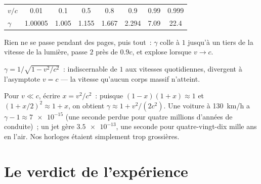 \begin{example}\label{ex:g12:special-relativity:gammatable}
\begin{center}\small
\begin{tabular}{lccccccc}
$v/c$    & 0.01     & 0.1   & 0.5   & 0.8   & 0.9   & 0.99 & 0.999\\
$\gamma$ & 1.00005 & 1.005 & 1.155 & 1.667 & 2.294 & 7.09 & 22.4
\end{tabular}
\end{center}
Rien ne se passe pendant des pages, puis tout~: $\gamma$ colle à $1$
jusqu'à un tiers de la vitesse de la lumière, passe $2$ près de
$0.9c$, et explose lorsque $v \to c$.
\end{example}

\begin{omfigure}

{\small $\gamma = 1/\sqrt{1 - v^2/c^2}$~: indiscernable de $1$ aux
vitesses quotidiennes, divergent à l'asymptote $v = c$
--- la vitesse qu'aucun corps massif n'atteint.}
\end{omfigure}

\begin{remark}\label{rem:g12:special-relativity:everyday}
Pour $v \ll c$, écrire $x = v^2/c^2$~: puisque $(1-x)(1+x) \approx 1$
et $(1 + x/2)^2 \approx 1 + x$, on obtient $\gamma \approx 1 +
v^2/(2c^2)$. Une voiture à \qty{130}{km/h} a $\gamma - 1 \approx
\num{7e-15}$ (une seconde perdue pour quatre millions d'années de
conduite)~; un jet gère $\num{3.5e-13}$, une seconde pour quatre-vingt-dix
mille ans en l'air. Nos horloges étaient simplement trop grossières.
\end{remark}

\section{Le verdict de l'expérience}

